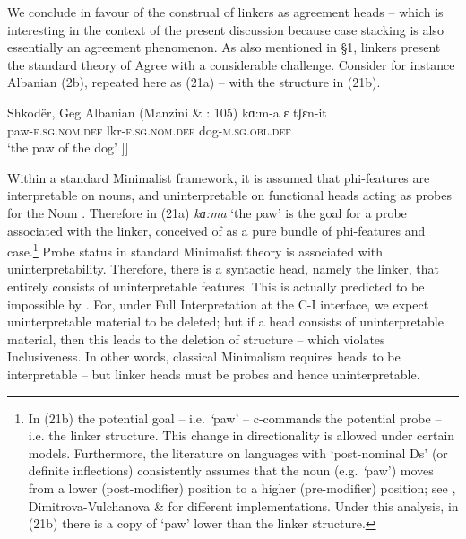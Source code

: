 \documentclass[output=paper]{langsci/langscibook}
\begin{document}
  We conclude in favour of the construal of linkers as agreement heads – which is interesting in the context of the present discussion because case stacking is also essentially an agreement phenomenon. As also mentioned in §1, linkers present the standard theory of Agree with a considerable challenge. Consider for instance Albanian (2b), repeated here as (21a) – with the structure in (21b).

\ea%
    \label{ex:manzini:21}
    \ea Shkodër, Geg Albanian (Manzini \& \citealt{Savoia2011b}: 105)
    \gll kɑ:m-a      ɛ          tʃɛn-it          \\
         paw-\textsc{f.sg.nom.def}   lkr-\textsc{f.sg.nom.def}  dog-\textsc{m.sg.obl.def} \\
    \glt ‘the paw of the dog’
    \ex\relax [\textsubscript{DP} kɑ:ma    [\textsubscript{Lkr} ɛ  [\textsubscript{DP} tʃɛnit ]]] 
    \z
\z{}

 Within a standard Minimalist framework, it is assumed that phi-features are interpretable on nouns, and uninterpretable on functional heads acting as probes for the Noun \citep{Carstens2001}. Therefore in (21a) \textit{kɑ:ma} ‘the paw’ is the goal for a probe associated with the linker, conceived of as a pure bundle of phi-features and case.\footnote{In (21b) the potential goal – i.e. \textit{‘}paw’ – c-commands the potential probe – i.e. the linker structure. This change in directionality is allowed under certain models. Furthermore, the literature on languages with ‘post-nominal Ds’ (or definite inflections) consistently assumes that the noun (e.g. \textit{‘}paw’) moves from a lower (post-modifier) position to a higher (pre-modifier) position; see \citet{Turano2002}, Dimitrova-Vulchanova \& \citet{Giusti1998} for different implementations. Under this analysis, in (21b) there is a copy of ‘paw’ lower than the linker structure.} Probe status in standard Minimalist theory is associated with uninterpretability. Therefore, there is a syntactic head, namely the linker, that entirely consists of uninterpretable features. This is actually predicted to be impossible by \citet{Chomsky1995}. For, under Full Interpretation at the C-I interface, we expect uninterpretable material to be deleted; but if a head consists of uninterpretable material, then this leads to the deletion of structure – which violates Inclusiveness. In other words, classical Minimalism requires heads to be interpretable – but linker heads must be probes and hence uninterpretable. 
\end{document}
